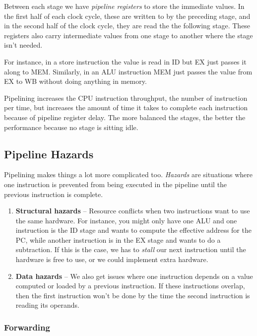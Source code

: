 \documentclass{article}
\begin{document}
Between each stage we have \textit{pipeline registers} to store the immediate values. In the first half of each clock cycle, these are written to by the preceding stage, and in the second half of the clock cycle, they are read the the following stage. These registers also carry intermediate values from one stage to another where the stage isn't needed. 

For instance, in a store instruction the value is read in ID but EX just passes it along to MEM.  Similarly, in an ALU instruction MEM just passes the value from EX to WB without doing anything in memory.

Pipelining increases the CPU instruction throughput, the number of instruction per time, but increases the amount of time it takes to complete each instruction because of pipeline register delay. The more balanced the stages, the better the performance because no stage is sitting idle.


\subsection{Pipeline Hazards}

Pipelining makes things a lot more complicated too. \textit{Hazards} are situations where one instruction is prevented from being executed in the pipeline until the previous instruction is complete. 

\begin{enumerate}

\item \textbf{Structural hazards} -- Resource conflicts when two instructions want to use the same hardware. For instance, you might only have one ALU and one instruction is the ID stage and wants to compute the effective address for the PC, while another instruction is in the EX stage and wants to do a subtraction. If this is the case, we has to \textit{stall} our next instruction until the hardware is free to use, or we could implement extra hardware.

\item \textbf{Data hazards} -- We also get issues where one instruction depends on a value computed or loaded by a previous instruction. If these instructions overlap, then the first instruction won't be done by the time the second instruction is reading its operands. 

\end{enumerate}


\subsubsection{Forwarding}
\end{document}
